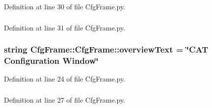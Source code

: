 Definition at line 30 of file CfgFrame.py.\hypertarget{classCfgFrame_1_1CfgFrame_a572a9f7b982bae5e808036bc38ea9d5c}{
\subsubsection[{objtype}]{}}
\label{classCfgFrame_1_1CfgFrame_a572a9f7b982bae5e808036bc38ea9d5c}


Definition at line 31 of file CfgFrame.py.\hypertarget{classCfgFrame_1_1CfgFrame_a09acfb884e2c5f8581f5b0691413a2aa}{
\subsubsection[{overviewText}]{\setlength{\rightskip}{0pt plus 5cm}string {\bf CfgFrame::CfgFrame::overviewText} = \char`\"{}CAT Configuration Window\char`\"{}}}
\label{classCfgFrame_1_1CfgFrame_a09acfb884e2c5f8581f5b0691413a2aa}


Definition at line 24 of file CfgFrame.py.\hypertarget{classCfgFrame_1_1CfgFrame_a7a50cede680918f3e56e10a6b7d542c5}{
\subsubsection[{parent}]{}}
\label{classCfgFrame_1_1CfgFrame_a7a50cede680918f3e56e10a6b7d542c5}


Definition at line 27 of file CfgFrame.py.\hypertarget{classCfgFrame_1_1CfgFrame_a8394944c11a10f2cf95dc35dac95d53d}{
\subsubsection[{path}]{}}
\label{classCfgFrame_1_1CfgFrame_a8394944c11a10f2cf95dc35dac95d53d}


